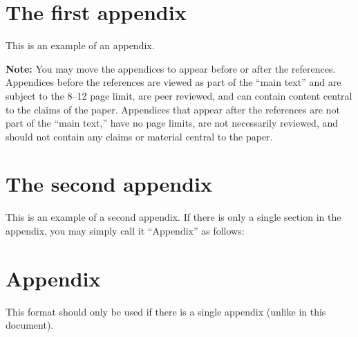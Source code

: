 \documentclass[10pt]{article} %
\begin{document}




\appendix

\section{The first appendix}
\label{sec:appendix1}
This is an example of an appendix. 

\noindent \textbf{Note:} You may move the appendices to appear before or after the references. Appendices before the references are viewed as part of the ``main text'' and are subject to the 8--12 page limit, are peer reviewed, and can contain content central to the claims of the paper. Appendices that appear after the references are not part of the ``main text,'' have no page limits, are not necessarily reviewed, and should not contain any claims or material central to the paper.

\section{The second appendix}
\label{sec:appendix2}
This is an example of a second appendix. If there is only a single section in the appendix, you may simply call it ``Appendix'' as follows:

\section*{Appendix}
This format should only be used if there is a single appendix (unlike in this document).
\end{document}
